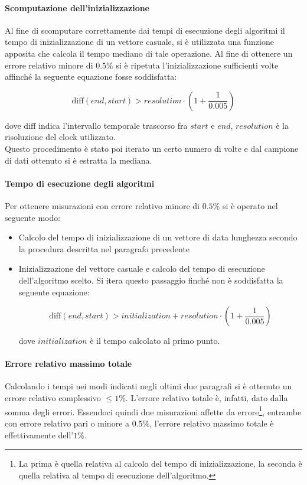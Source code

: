 \documentclass{article}
\begin{document}
	\paragraph{Scomputazione dell'inizializzazione}
	Al fine di scomputare correttamente dai tempi di esecuzione degli algoritmi il tempo di inizializzazione di un vettore casuale, si è utilizzata una funzione apposita che calcola il tempo mediano di tale operazione. Al fine di ottenere un errore relativo minore di $0.5\%$ si è ripetuta l'inizializzazione sufficienti volte affinché la seguente equazione fosse soddisfatta:
	
	\[
		\text{diff}\left(end, start\right) > resolution \cdot \left(1+\frac{1}{0.005}\right)  
	\]
	
	dove $\text{diff}$ indica l'intervallo temporale trascorso fra $start$ e $end$, $resolution$ è la risoluzione del clock utilizzato. \\ Questo procedimento è stato poi iterato un certo numero di volte e dal campione di dati ottenuto si è estratta la mediana.
	
	\paragraph{Tempo di esecuzione degli algoritmi}
	Per ottenere misurazioni con errore relativo minore di $0.5\%$ si è operato nel seguente modo:
	
	\begin{itemize}
		\item Calcolo del tempo di inizializzazione di un vettore di data lunghezza secondo la procedura descritta nel paragrafo precedente
		\item Inizializzazione del vettore casuale e calcolo del tempo di esecuzione dell'algoritmo scelto. Si itera questo passaggio finché non è soddisfatta la seguente equazione:
		
			\[
				\text{diff}\left(end, start\right) > initialization + resolution \cdot \left(1+\frac{1}{0.005}\right)  
			\]
			
			dove $initialization$ è il tempo calcolato al primo punto.
	\end{itemize}
	
	\newpage
	
	\paragraph{Errore relativo massimo totale}
	Calcolando i tempi nei modi indicati negli ultimi due paragrafi si è ottenuto un errore relativo complessivo $\leq1\%$. L'errore relativo totale è, infatti, dato dalla somma degli errori. Essendoci quindi due misurazioni affette da errore\footnote{La prima è quella relativa al calcolo del tempo di inizializzazione, la seconda è quella relativa al tempo di esecuzione dell'algoritmo.}, entrambe con errore relativo pari o minore a $0.5\%$, l'errore relativo massimo totale è effettivamente dell'$1\%$.
	
\end{document}
